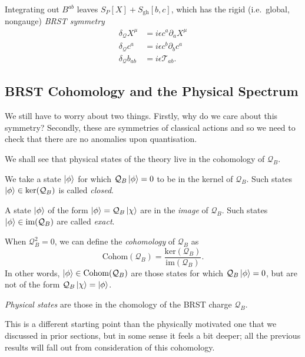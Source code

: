 Integrating out $B^{ab}$ leaves $S_P[X] + S_{\text{gh}}[b, c]$, which has the rigid (i.e.~global, nongauge) \emph{BRST symmetry}
\begin{align}
  \delta_\mathcal{Q} X^{\mu} &= i \epsilon c^{a} \partial_{a} X^{\mu} \\
  \delta_\mathcal{Q} c^{a} &= i \epsilon c^{b} \partial_{b} c^{a} \\
  \delta_{\mathcal{Q}} b_{ab} &= i \epsilon \mathcal{T}_{ab}.
\end{align}

\subsection{BRST Cohomology and the Physical Spectrum}%
\label{sub:brst_cohomology_and_the_physical_spectrum}

We still have to worry about two things. Firstly, why do we care about this symmetry? Secondly, these are symmetries of classical actions and so we need to check that there are no anomalies upon quantisation.

We shall see that physical states of the theory live in the cohomology of $\mathcal{Q}_B$.
\begin{definition}[kernel]
  We take a state $\ket{\phi}$ for which $\mathcal{Q}_B \ket{\phi} = 0$ to be in the kernel of $\mathcal{Q}_B$. Such states $\ket{\phi} \in \text{ker}(\mathcal{Q}_B)$ is called \emph{closed}.
\end{definition}
\begin{definition}[image]
  A state $\ket{\phi}$ of the form $\ket{\phi} = \mathcal{Q}_B \ket{\chi}$ are in the \emph{image} of $\mathcal{Q}_B$. Such states $\ket{\phi} \in \text{im}(\mathcal{Q}_B)$ are called \emph{exact}.
\end{definition}
\begin{definition}[cohomology]
  When $\mathcal{Q}_B^2 = 0$, we can define the \emph{cohomology} of $\mathcal{Q}_B$ as
  \begin{equation}
    \text{Cohom}(\mathcal{Q}_B) = \frac{\text{ker}(\mathcal{Q}_B)}{\text{im}(\mathcal{Q}_B)}.
  \end{equation}
  In other words, $\ket{\phi} \in \text{Cohom}(\mathcal{Q}_B)$ are those states for which $\mathcal{Q}_B \ket{\phi} = 0$, but are not of the form $\mathcal{Q}_B \ket{\chi} = \ket{\phi}$.
\end{definition}
\begin{definition}
  \emph{Physical states} are those in the chomology of the BRST charge $\mathcal{Q}_B$.
\end{definition}
This is a different starting point than the physically motivated one that we discussed in prior sections, but in some sense it feels a bit deeper; all the previous results will fall out from consideration of this cohomology.

